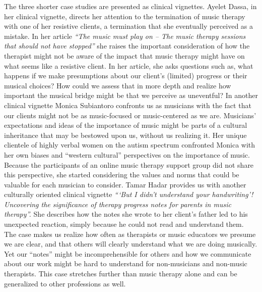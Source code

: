 \documentclass[authordate, empirical, issue]{jote-new-article}
\begin{document}
The three shorter case studies are presented as clinical vignettes. Ayelet Dassa, in her clinical vignette, directs her attention to the termination of music therapy with one of her resistive clients, a termination that she eventually perceived as a mistake. In her article \emph{“The music must play on -- The music therapy sessions that should not have stopped” }she raises the important consideration of how the therapist might not be aware of the impact that music therapy might have on what seems like a resistive client. In her article, she asks questions such as, what happens if we make presumptions about our client's (limited) progress or their musical choices? How could we assess that in more depth and realize how important the musical bridge might be that we perceive as uneventful? In another clinical vignette Monica Subiantoro confronts us as musicians with the fact that our clients might not be as music-focused or music-centered as we are. Musicians' expectations and ideas of the importance of music might be parts of a cultural inheritance that may be bestowed upon us, without us realizing it. Her unique clientele of highly verbal women on the autism spectrum confronted Monica with her own biases and “western cultural” perspectives on the importance of music. Because the participants of an online music therapy support group did not share this perspective, she started considering the values and norms that could be valuable for each musician to consider. Tamar Hadar provides us with another culturally oriented clinical vignette \emph{“‘But I didn't understand your handwriting'! Uncovering the significance of therapy progress notes for parents in music therapy”.} She describes how the notes she wrote to her client's father led to his unexpected reaction, simply because he could not read and understand them. The case makes us realize how often as therapists or music educators we presume we are clear, and that others will clearly understand what we are doing musically. Yet our “notes” might be incomprehensible for others and how we communicate about our work might be hard to understand for non-musicians and non-music therapists. This case stretches further than music therapy alone and can be generalized to other professions as well.
\end{document}
